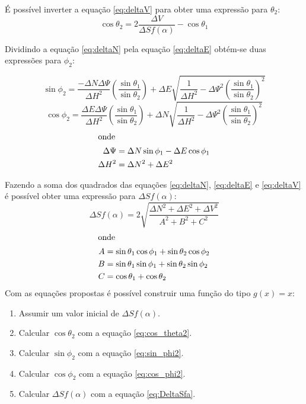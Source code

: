 \documentclass[final,3p,12pt]{elsarticle}
\begin{document}
É possível inverter a equação \ref{eq:deltaV} para obter uma expressão para $\theta_2$:
\begin{equation} \label{eq:cos_theta2}
    \cos \theta_2 = 2 \frac{\Delta V}{\Delta S f(\alpha)} - \cos \theta_1 
\end{equation}

Dividindo a equação \ref{eq:deltaN} pela equação \ref{eq:deltaE} obtém-se duas expressões para $\phi_2$:

\begin{equation} \label{eq:sin_phi2}
    \sin \phi_2 = \frac{-\Delta N \Delta \Psi}{\Delta H^2} \left( \frac{\sin \theta_1}{\sin \theta_2} \right) + \Delta E \sqrt{\frac{1}{\Delta H^2} - \Delta \Psi^2 \left( \frac{\sin \theta_1}{\sin \theta_2} \right)^2} 
\end{equation}
\begin{equation} \label{eq:cos_phi2}
    \cos \phi_2 = \frac{\Delta E \Delta \Psi}{\Delta H^2} \left( \frac{\sin \theta_1}{\sin \theta_2} \right) + \Delta N \sqrt{\frac{1}{\Delta H^2} - \Delta \Psi^2 \left( \frac{\sin \theta_1}{\sin \theta_2} \right)^2} 
\end{equation}
\begin{align*}
    \intertext{onde}
    \Delta \Psi &= \Delta N \sin \phi_1 - \Delta E \cos \phi_1 \\
    \Delta H^2 &= \Delta N^2 + \Delta E^2
\end{align*}

Fazendo a soma dos quadrados das equações \ref{eq:deltaN}, \ref{eq:deltaE} e \ref{eq:deltaV} é possível obter uma expressão para $\Delta S f(\alpha)$:
\begin{equation} \label{eq:DeltaSfa}
    \Delta S f(\alpha) = 2 \sqrt{\frac{\Delta N^2 + \Delta E^2 + \Delta V^2}{A^2+B^2+C^2}}
\end{equation}
\begin{align*}
    \intertext{onde}
    A &= \sin \theta_1 \cos \phi_1 + \sin \theta_2 \cos \phi_2 \\
    B &= \sin \theta_1 \sin \phi_1 + \sin \theta_2 \sin \phi_2 \\
    C &= \cos \theta_1 + \cos \theta_2
\end{align*}
Com as equações propostas é possível construir uma função do tipo $g(x)=x$:

\begin{enumerate}
    \item Assumir um valor inicial de $\Delta S f(\alpha)$.
    \item Calcular $\cos \theta_2$ com a equação \ref{eq:cos_theta2}.
    \item Calcular $\sin \phi_2$ com a equação \ref{eq:sin_phi2}.
    \item Calcular $\cos \phi_2$ com a equação \ref{eq:cos_phi2}.
    \item Calcular $\Delta S f(\alpha)$ com a equação \ref{eq:DeltaSfa}.
\end{enumerate}
\end{document}
